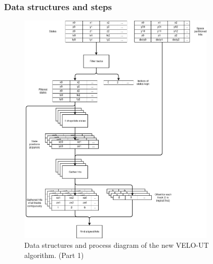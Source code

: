 \documentclass[12pt]{article}
\begin{document}
\subsubsection{Data structures and steps}

\begin{figure}[H]
	\begin{center}
		\includegraphics[width=0.85\textwidth]{velout_opt_datastruct_flow_p1}
	\end{center}
	\caption{Data structures and process diagram of the new VELO-UT algorithm. (Part 1)}
	\label{fig_velout_opt_datastruct_flow_p1}
\end{figure}
\end{document}
